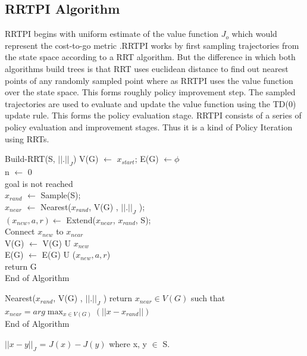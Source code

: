 \documentclass[MTech]{iitmdiss}
\begin{document}
\subsection{RRTPI Algorithm}

RRTPI begins with uniform estimate of the value function $J_o$ which would represent the cost-to-go metric .RRTPI works by first sampling trajectories from the state space according to a RRT algorithm. But the difference in which both algorithms build trees is that RRT uses euclidean distance to find out nearest points of any randomly sampled point where as RRTPI uses the value function over the state space. This forms roughly policy improvement step. The sampled trajectories are used to evaluate and update the value function using the TD(0) update rule. This forms the policy evaluation stage. RRTPI consists of a series of policy evaluation and improvement stages. Thus it is a kind of Policy Iteration using RRTs. 

\begin{algorithm}{Build-RRT(S, $|| . ||_J$)}{
\label{algo:Build-RRT}
}
 V(G) $\leftarrow$ {$x_{start}$};  E(G) $\leftarrow${$\phi$ } \\
 n $\leftarrow$ 0\\
\qwhile goal is not reached \\
$x_{rand}$ $\leftarrow$ Sample(S);\\
$x_{near}$ $\leftarrow$ Nearest($x_{rand}$, V(G) , $|| . ||_J $ );\\
$(x_{new}, a, r) \leftarrow$ Extend($x_{near}$, $x_{rand}$, S);\\
Connect $x_{new}$ to $x_{near}$\\
V(G) $\leftarrow$ V(G) U {$ x_{new}$ }\\
E(G) $\leftarrow$ E(G) U ($x_{new}, a, r$)\qend\\
return G\\
End of Algorithm
\end{algorithm}

\begin{algorithm}{Nearest($x_{rand}$, V(G) , $|| . ||_J$ )}{
\label{algo:Nearest}
}
return $x_{near} \in V(G)$ such that  $x_{near} = \displaystyle arg\max_{x \in V(G)} (|| x - x_{rand}|| ) $\\
End of Algorithm
\end{algorithm}
$||x - y||_J$ = $J(x) - J(y)$ where x, y $\in$ S.
 
\end{document}
